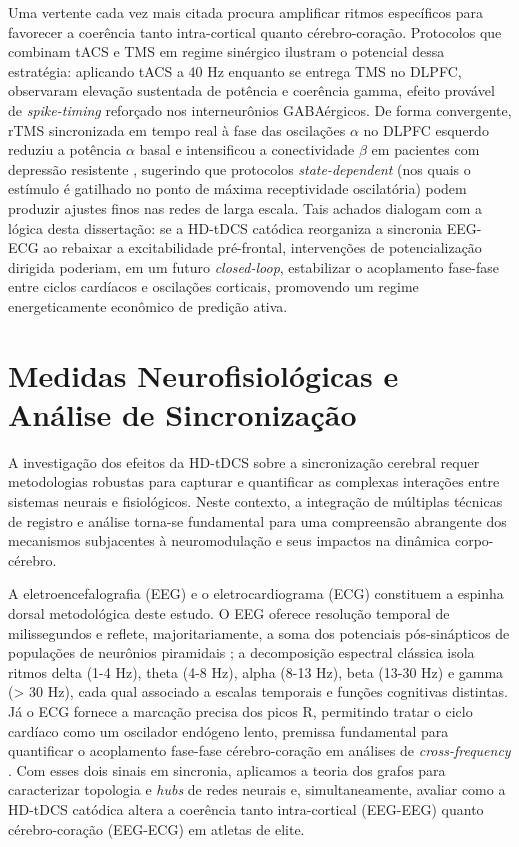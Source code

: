 Uma vertente cada vez mais citada procura amplificar ritmos específicos para favorecer a coerência tanto intra-cortical quanto cérebro-coração. Protocolos que combinam tACS e TMS em regime sinérgico ilustram o potencial dessa estratégia: aplicando tACS a 40 Hz enquanto se entrega TMS no DLPFC,  observaram elevação sustentada de potência e coerência gamma, efeito provável de \emph{spike-timing} reforçado nos interneurônios GABAérgicos. De forma convergente, rTMS sincronizada em tempo real à fase das oscilações $\alpha$ no DLPFC esquerdo reduziu a potência $\alpha$ basal e intensificou a conectividade $\beta$ em pacientes com depressão resistente \cite{zrenner2020brain}, sugerindo que protocolos \emph{state-dependent} (nos quais o estímulo é gatilhado no ponto de máxima receptividade oscilatória) podem produzir ajustes finos nas redes de larga escala. Tais achados dialogam com a lógica desta dissertação: se a HD-tDCS catódica reorganiza a sincronia EEG-ECG ao rebaixar a excitabilidade pré-frontal, intervenções de potencialização dirigida poderiam, em um futuro \emph{closed-loop}, estabilizar o acoplamento fase-fase entre ciclos cardíacos e oscilações corticais, promovendo um regime energeticamente econômico de predição ativa.


\section{Medidas Neurofisiológicas e Análise de Sincronização}
A investigação dos efeitos da HD-tDCS sobre a sincronização cerebral requer metodologias robustas para capturar e quantificar as complexas interações entre sistemas neurais e fisiológicos. Neste contexto, a integração de múltiplas técnicas de registro e análise torna-se fundamental para uma compreensão abrangente dos mecanismos subjacentes à neuromodulação e seus impactos na dinâmica corpo-cérebro.

A eletroencefalografia (EEG) e o eletrocardiograma (ECG) constituem a espinha dorsal metodológica deste estudo. O EEG oferece resolução temporal de milissegundos e reflete, majoritariamente, a soma dos potenciais pós-sinápticos de populações de neurônios piramidais \cite{cohen2017where}; a decomposição espectral clássica isola ritmos delta (1-4 Hz), theta (4-8 Hz), alpha (8-13 Hz), beta (13-30 Hz) e gamma (> 30 Hz), cada qual associado a escalas temporais e funções cognitivas distintas. Já o ECG fornece a marcação precisa dos picos R, permitindo tratar o ciclo cardíaco como um oscilador endógeno lento, premissa fundamental para quantificar o acoplamento fase-fase cérebro-coração em análises de \textit{cross-frequency} \cite{criscuolo2022cognition,park2018neural}. Com esses dois sinais em sincronia, aplicamos a teoria dos grafos para caracterizar topologia e \textit{hubs} de redes neurais \cite{bullmore2009complex} e, simultaneamente, avaliar como a HD-tDCS catódica altera a coerência tanto intra-cortical (EEG-EEG) quanto cérebro-coração (EEG-ECG) em atletas de elite.


